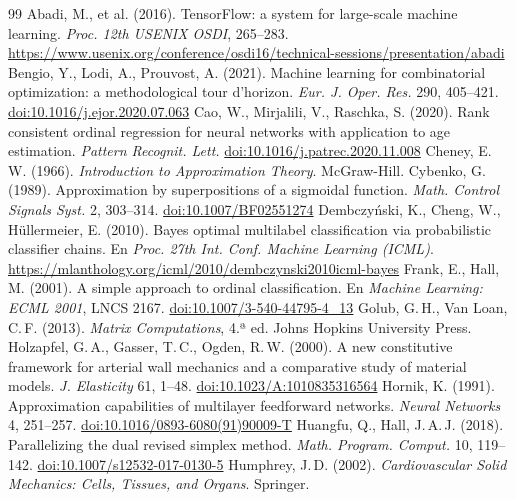 \begin{thebibliography}{99}\footnotesize\setlength{\itemsep}{0pt}
 Abadi, M., et al. (2016). TensorFlow: a system for large-scale machine learning. \emph{Proc. 12th USENIX OSDI}, 265--283. \url{https://www.usenix.org/conference/osdi16/technical-sessions/presentation/abadi}
 Bengio, Y., Lodi, A., Prouvost, A. (2021). Machine learning for combinatorial optimization: a methodological tour d'horizon. \emph{Eur. J. Oper. Res.} 290, 405--421. \href{https://doi.org/10.1016/j.ejor.2020.07.063}{doi:10.1016/j.ejor.2020.07.063}
 Cao, W., Mirjalili, V., Raschka, S. (2020). Rank consistent ordinal regression for neural networks with application to age estimation. \emph{Pattern Recognit. Lett.} \href{https://doi.org/10.1016/j.patrec.2020.11.008}{doi:10.1016/j.patrec.2020.11.008}
 Cheney, E.\,W. (1966). \emph{Introduction to Approximation Theory}. McGraw-Hill.
 Cybenko, G. (1989). Approximation by superpositions of a sigmoidal function. \emph{Math. Control Signals Syst.} 2, 303--314. \href{https://doi.org/10.1007/BF02551274}{doi:10.1007/BF02551274}
 Dembczy\'nski, K., Cheng, W., Hüllermeier, E. (2010). Bayes optimal multilabel classification via probabilistic classifier chains. En \emph{Proc. 27th Int. Conf. Machine Learning (ICML)}. \url{https://mlanthology.org/icml/2010/dembczynski2010icml-bayes}
 Frank, E., Hall, M. (2001). A simple approach to ordinal classification. En \emph{Machine Learning: ECML 2001}, LNCS 2167. \href{https://doi.org/10.1007/3-540-44795-4_13}{doi:10.1007/3-540-44795-4\_13}
 Golub, G.\,H., Van Loan, C.\,F. (2013). \emph{Matrix Computations}, 4.ª ed. Johns Hopkins University Press.
 Holzapfel, G.\,A., Gasser, T.\,C., Ogden, R.\,W. (2000). A new constitutive framework for arterial wall mechanics and a comparative study of material models. \emph{J. Elasticity} 61, 1--48. \href{https://doi.org/10.1023/A:1010835316564}{doi:10.1023/A:1010835316564}
 Hornik, K. (1991). Approximation capabilities of multilayer feedforward networks. \emph{Neural Networks} 4, 251--257. \href{https://doi.org/10.1016/0893-6080(91)90009-T}{doi:10.1016/0893-6080(91)90009-T}
 Huangfu, Q., Hall, J.\,A.\,J. (2018). Parallelizing the dual revised simplex method. \emph{Math. Program. Comput.} 10, 119--142. \href{https://doi.org/10.1007/s12532-017-0130-5}{doi:10.1007/s12532-017-0130-5}
 Humphrey, J.\,D. (2002). \emph{Cardiovascular Solid Mechanics: Cells, Tissues, and Organs}. Springer.

\end{thebibliography}
